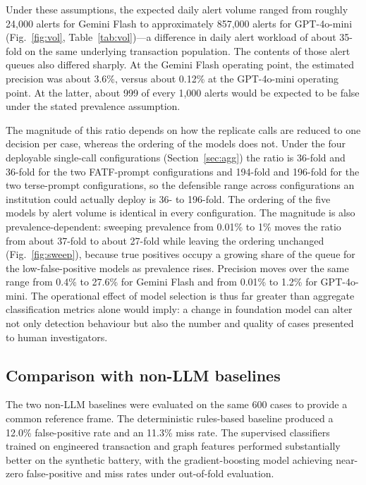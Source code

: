 \documentclass[pdflatex,sn-basic,Numbered]{sn-jnl}
\begin{document}
Under these assumptions, the expected daily alert volume ranged from roughly 24,000 alerts for Gemini Flash to approximately 857,000 alerts for GPT-4o-mini (Fig.~\ref{fig:vol}, Table~\ref{tab:vol})---a difference in daily alert workload of about 35-fold on the same underlying transaction population. The contents of those alert queues also differed sharply. At the Gemini Flash operating point, the estimated precision was about 3.6\%, versus about 0.12\% at the GPT-4o-mini operating point. At the latter, about 999 of every 1,000 alerts would be expected to be false under the stated prevalence assumption.

The magnitude of this ratio depends on how the replicate calls are reduced to one decision per case, whereas the ordering of the models does not. Under the four deployable single-call configurations (Section~\ref{sec:agg}) the ratio is 36-fold and 36-fold for the two FATF-prompt configurations and 194-fold and 196-fold for the two terse-prompt configurations, so the defensible range across configurations an institution could actually deploy is 36- to 196-fold. The ordering of the five models by alert volume is identical in every configuration. The magnitude is also prevalence-dependent: sweeping prevalence from 0.01\% to 1\% moves the ratio from about 37-fold to about 27-fold while leaving the ordering unchanged (Fig.~\ref{fig:sweep}), because true positives occupy a growing share of the queue for the low-false-positive models as prevalence rises. Precision moves over the same range from 0.4\% to 27.6\% for Gemini Flash and from 0.01\% to 1.2\% for GPT-4o-mini. The operational effect of model selection is thus far greater than aggregate classification metrics alone would imply: a change in foundation model can alter not only detection behaviour but also the number and quality of cases presented to human investigators.

\subsection{Comparison with non-LLM baselines}\label{sec:baselines}

The two non-LLM baselines were evaluated on the same 600 cases to provide a common reference frame. The deterministic rules-based baseline produced a 12.0\% false-positive rate and an 11.3\% miss rate. The supervised classifiers trained on engineered transaction and graph features performed substantially better on the synthetic battery, with the gradient-boosting model achieving near-zero false-positive and miss rates under out-of-fold evaluation.
\end{document}
